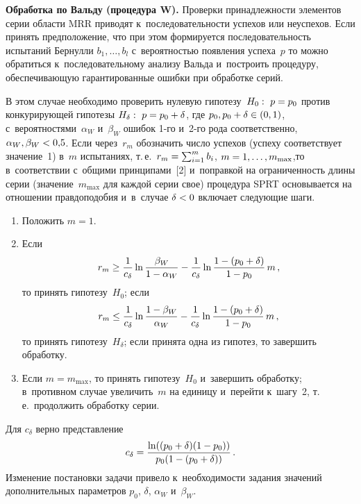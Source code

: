 \begin{multicols}{2}
     \textbf{Обработка по Вальду (процедура W).} Проверки 
принадлежности элементов серии области MRR приводят 
к~последовательности успехов или неуспехов. Если принять предположение, 
что при этом формируется последовательность испытаний Бернулли $b_1,\ldots 
, b_l$ с~вероятностью появления успеха~$p$ то можно обратиться 
к~последовательному анализу Вальда и~построить процедуру, 
обеспечивающую гарантированные ошибки при обработке \mbox{серий}. 
{

}
     
     В этом случае необходимо проверить нулевую гипотезу~$H_0:\ 
p\hm=p_0$ против конкурирующей гипотезы $H_\delta:\ p\hm=p_0\hm+\delta$, 
где $p_0, p_0\hm+\delta \hm\in (0,1)$, с~вероятностями~$\alpha_W$ 
и~$\beta_W$ ошибок 1-го и~2-го рода соответственно, $\alpha_W, \beta_W\hm< 
0{,}5$. Если через~$r_m$ обозначить число успехов (успеху соответствует 
значение~1) в~$m$ испытаниях, т.\,е.\ $r_m\hm= \sum\nolimits^m_{i=1} b_i$, 
$m\hm= 1,\ldots , m_{\max}$,\linebreak то в~соответствии с~общими принципами~[2] 
и~поправкой на ограниченность длины серии (значение~$m_{\max}$ для 
каждой серии свое) процедура SPRT основывается на отношении правдоподобия и~в~случае 
$\delta\hm<0$ включает сле\-ду\-ющие шаги.

\columnbreak

\noindent
     \begin{enumerate}[1.]
\item Положить $m=1$.
\item Если 
$$
r_m \geq \fr{1}{c_\delta}\ln \fr{\beta_W}{1-\alpha_W}-\fr{1}{c_\delta}
 \ln \fr{1-(p_0\hm+\delta)}{1-p_0}\,m\,,
 $$ 
 то принять гипотезу~$H_0$; если 
$$r_m\leq 
\fr{1}{c_\delta}\ln \fr{1-\beta_W}{\alpha_W}-\fr{1}{c_\delta} \ln 
\fr{1-(p_0\hm+\delta)}{1\hm-p_0}\,m\,,
$$ 
то принять гипотезу~$H_\delta$; 
если принята одна из гипотез, то завершить обработку.
\item Если $m=m_{\max}$, то принять гипотезу~$H_0$ и~завершить 
обработку; в~противном случае увеличить~$m$ на единицу и~перейти 
к~шагу~2, т.\,е.\ продолжить обработку серии.
\end{enumerate}
Для $c_\delta $ верно представление 
$$
c_\delta = \displaystyle\frac{\displaystyle \ln((p_0+\delta)(1-p_0))\mathstrut}{\displaystyle p_0(1-(p_0+\delta))\mathstrut}\,.
$$
Изменение постановки задачи привело к~необходимости задания значений 
дополнительных параметров $p_0$, $\delta$, $\alpha_W$ и~$\beta_W$.

\medskip


\end{multicols}
